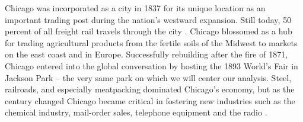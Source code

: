 \documentclass[12pt]{article}
\begin{document}
Chicago was incorporated as a city in 1837 for its unique location as an important trading post during the nation's westward expansion. Still today, 50 percent of all freight rail travels through the city \citep{chicagohistory}. Chicago blossomed as a hub for trading agricultural products from the fertile soils of the Midwest to markets on the east coast and in Europe. Successfully rebuilding after the fire of 1871, Chicago entered into the global conversation by hosting the 1893 World's Fair in Jackson Park -- the very same park on which we will center our analysis. Steel, railroads, and especially meatpacking dominated Chicago's economy, but as the century changed Chicago became critical in fostering new industries such as the chemical industry, mail-order sales, telephone equipment and the radio \citep{chicagobrit}. 
\end{document}

